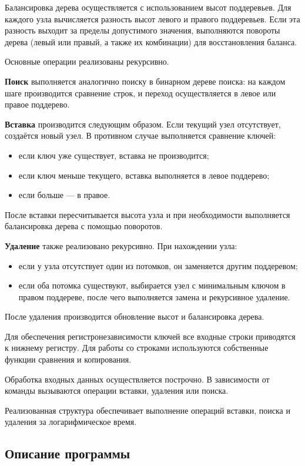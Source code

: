 \documentclass[12pt]{article}
\begin{document}
Балансировка дерева осуществляется с использованием высот поддеревьев. Для каждого узла вычисляется разность высот левого и правого поддеревьев. Если эта разность выходит за пределы допустимого значения, выполняются повороты дерева (левый или правый, а также их комбинации) для восстановления баланса.

Основные операции реализованы рекурсивно.

\textbf{Поиск} выполняется аналогично поиску в бинарном дереве поиска: на каждом шаге производится сравнение строк, и переход осуществляется в левое или правое поддерево.

\textbf{Вставка} производится следующим образом. Если текущий узел отсутствует, создаётся новый узел. В противном случае выполняется сравнение ключей:
\begin{itemize}
	\item если ключ уже существует, вставка не производится;
	\item если ключ меньше текущего, вставка выполняется в левое поддерево;
	\item если больше --- в правое.
\end{itemize}
После вставки пересчитывается высота узла и при необходимости выполняется балансировка дерева с помощью поворотов.

\textbf{Удаление} также реализовано рекурсивно. При нахождении узла:
\begin{itemize}
	\item если у узла отсутствует один из потомков, он заменяется другим поддеревом;
	\item если оба потомка существуют, выбирается узел с минимальным ключом в правом поддереве, после чего выполняется замена и рекурсивное удаление.
\end{itemize}
После удаления производится обновление высот и балансировка дерева.

Для обеспечения регистронезависимости ключей все входные строки приводятся к нижнему регистру. Для работы со строками используются собственные функции сравнения и копирования.

Обработка входных данных осуществляется построчно. В зависимости от команды вызываются операции вставки, удаления или поиска.

Реализованная структура обеспечивает выполнение операций вставки, поиска и удаления за логарифмическое время.

\subsection*{Описание программы}
\end{document}
